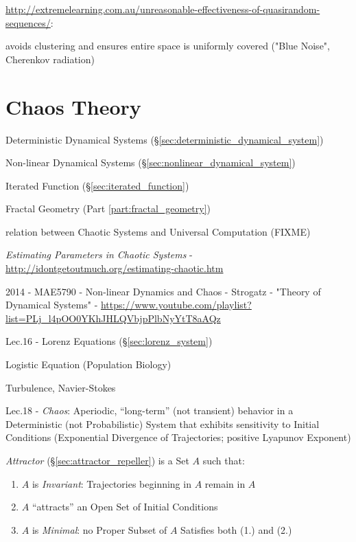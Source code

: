 \url{http://extremelearning.com.au/unreasonable-effectiveness-of-quasirandom-sequences/}:

avoids clustering and ensures entire space is uniformly covered ("Blue Noise",
Cherenkov radiation)



\section{Chaos Theory}\label{sec:chaos_theory}

Deterministic Dynamical Systems (\S\ref{sec:deterministic_dynamical_system})

Non-linear Dynamical Systems (\S\ref{sec:nonlinear_dynamical_system})

Iterated Function (\S\ref{sec:iterated_function})

Fractal Geometry (Part \ref{part:fractal_geometry})

relation between Chaotic Systems and Universal Computation (FIXME)

\emph{Estimating Parameters in Chaotic Systems} -
\url{http://idontgetoutmuch.org/estimating-chaotic.htm}

2014 - MAE5790 - Non-linear Dynamics and Chaos - Strogatz - "Theory of
Dynamical Systems" -
\url{https://www.youtube.com/playlist?list=PLj_l4pOO0YKhJHLQVbjpPlbNyYtT8aAQz}

Lec.16 - Lorenz Equations (\S\ref{sec:lorenz_system})

Logistic Equation (Population Biology)

Turbulence, Navier-Stokes

Lec.18 - \emph{Chaos}: Aperiodic, ``long-term'' (not transient) behavior in a
Deterministic (not Probabilistic) System that exhibits sensitivity to Initial
Conditions (Exponential Divergence of Trajectories; positive Lyapunov Exponent)

\emph{Attractor} (\S\ref{sec:attractor_repeller}) is a Set $A$ such that:
\begin{enumerate}
  \item $A$ is \emph{Invariant}: Trajectories beginning in $A$ remain in $A$
  \item $A$ ``attracts'' an Open Set of Initial Conditions
  \item $A$ is \emph{Minimal}: no Proper Subset of $A$ Satisfies both (1.) and
    (2.)
\end{enumerate}

